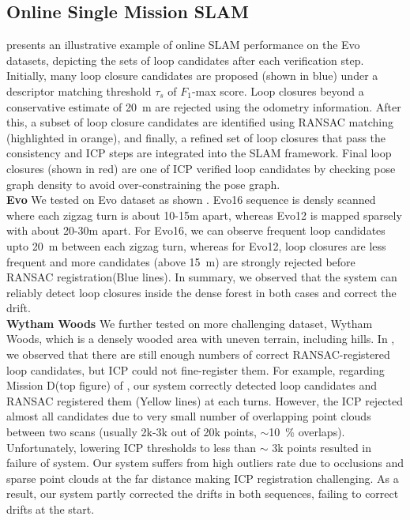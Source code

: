 \subsection*{Online Single Mission SLAM }
 presents an illustrative example of online SLAM performance on the Evo datasets, depicting the sets of loop candidates after each verification step. Initially, many loop closure candidates are proposed (shown in blue) under a descriptor matching threshold $\tau_{s}$ of $F_1$-max score. Loop closures beyond a conservative estimate of \SI{20}{\meter} are rejected using the odometry information. After this, a subset of loop closure candidates are identified using RANSAC matching (highlighted in orange), and finally, a refined set of loop closures that pass the consistency and ICP steps are integrated into the SLAM framework. Final loop closures (shown in red) are one of ICP verified loop candidates by checking pose graph density to avoid over-constraining the pose graph. \\
\textbf{Evo}\hspace{0.5em} We tested on Evo dataset as shown . Evo16 sequence is densly scanned where each zigzag turn is about 10-15m apart, whereas Evo12 is mapped sparsely with about 20-30m apart. For Evo16, we can observe frequent loop candidates upto \SI{20}{\meter} between each zigzag turn, whereas for Evo12, loop closures are less frequent and more candidates (above \SI{15}{\meter}) are strongly rejected before RANSAC registration(Blue lines). In summary, we observed that the system can reliably detect loop closures inside the dense forest in both cases and correct the drift. \\
\textbf{Wytham Woods}\hspace{0.5em} We further tested on more challenging dataset, Wytham Woods, which is a densely wooded area with uneven terrain, including hills. In , we observed that there are still enough numbers of correct RANSAC-registered loop candidates, but ICP could not fine-register them. For example, regarding Mission D(top figure) of , our system correctly detected loop candidates and RANSAC registered them (Yellow lines) at each turns. However, the ICP rejected almost all candidates due to very small number of overlapping point clouds between two scans (usually 2k-3k out of 20k points, $\sim$\SI{10}{\percent} overlaps). Unfortunately, lowering ICP thresholds to less than $\sim$ 3k points resulted in failure of system. Our system suffers from high outliers rate due to occlusions and sparse point clouds at the far distance making ICP registration challenging. As a result, our system partly corrected the drifts in both sequences, failing to correct drifts at the start. 

